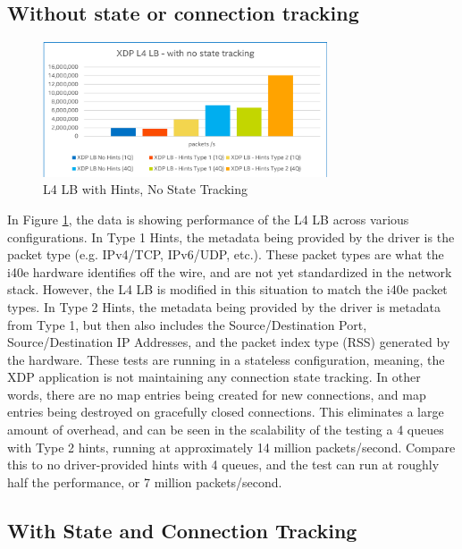 \documentclass[letterpaper]{article}
\begin{document}
\subsection{Without state or connection tracking}

\begin{figure}[h]
\includegraphics[width=3.31in]{l4-perf-no-tracking.png}
\caption{L4 LB with Hints, No State Tracking}
\label{l4-perf-no-tracking}
\end{figure}

In Figure \ref{l4-perf-no-tracking}, the data is showing performance of the L4 LB across various configurations.
\newline
\newline
In Type 1 Hints, the metadata being provided by the driver is the packet type (e.g. IPv4/TCP, IPv6/UDP, etc.).  These packet types are what the i40e hardware identifies off the wire, and are not yet standardized in the network stack.  However, the L4 LB is modified in this situation to match the i40e packet types.
\newline
\newline
In Type 2 Hints, the metadata being provided by the driver is metadata from Type 1, but then also includes the Source/Destination Port, Source/Destination IP Addresses, and the packet index type (RSS) generated by the hardware.
\newline
\newline
These tests are running in a stateless configuration, meaning, the XDP application is not maintaining any connection state tracking.  In other words, there are no map entries being created for new connections, and map entries being destroyed on gracefully closed connections.  This eliminates a large amount of overhead, and can be seen in the scalability of the testing a 4 queues with Type 2 hints, running at approximately 14 million packets/second.  Compare this to no driver-provided hints with 4 queues, and the test can run at roughly half the performance, or 7 million packets/second.

\subsection{With State and Connection Tracking}
\end{document}
